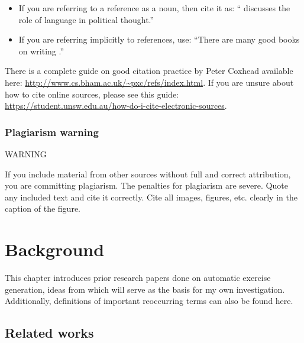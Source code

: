 \documentclass{l4proj}
\begin{document}
\begin{itemize}
\item If you are referring to a reference as a noun, then cite it as: ``\citet{Orw68} discusses the role of language in political thought.''
\item If you are referring implicitly to references, use: ``There are many good books on writing \citep{Orw68, Wil09, Pin15}.''
\end{itemize}

There is a complete guide on good citation practice by Peter Coxhead available here: \url{http://www.cs.bham.ac.uk/~pxc/refs/index.html}. 
If you are unsure about how to cite online sources, please see this guide: \url{https://student.unsw.edu.au/how-do-i-cite-electronic-sources}.

\subsection{Plagiarism warning}

\begin{highlight_title}{WARNING}
    
    If you include material from other sources without full and correct attribution, you are committing plagiarism. The penalties for plagiarism are severe.
    Quote any included text and cite it correctly. Cite all images, figures, etc. clearly in the caption of the figure.
\end{highlight_title}


\chapter{Background}
\label{chap:back}

This chapter introduces prior research papers done on automatic exercise generation, ideas from which will serve as the basis for my own investigation. Additionally, definitions of important reoccurring terms can also be found here.

\section{Related works}
\end{document}
